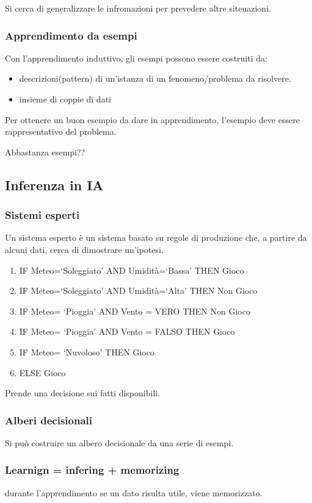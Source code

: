 Si cerca di generalizzare le infromazioni per prevedere altre siteuazioni.

\subsubsection{Apprendimento da esempi}
Con l'apprendimento induttivo, gli esempi possono essere costruiti da:
\begin{itemize}
    \item descrizioni(pattern) di un'istanza di un fenomeno/problema da risolvere.
    \item insieme di coppie di dati
\end{itemize}

Per ottenere un buon esempio da dare in apprendimento, l'esempio deve essere rappresentativo del problema.

Abbastanza esempi??

\subsection{Inferenza in IA}
\subsubsection{Sistemi esperti}
Un sistema esperto è un sistema basato su regole di produzione che, a partire da alcuni dati, cerca
di dimostrare un'ipotesi.

\begin{enumerate}
    \item IF Meteo=‘Soleggiato’ AND Umidità=‘Bassa’ THEN Gioco
    \item IF Meteo=‘Soleggiato’ AND Umidità=‘Alta’ THEN Non Gioco
    \item IF Meteo= ‘Pioggia’ AND Vento = VERO THEN Non Gioco
    \item IF Meteo= ‘Pioggia’ AND Vento = FALSO THEN Gioco
    \item IF Meteo= ‘Nuvoloso’ THEN Gioco
    \item ELSE Gioco
\end{enumerate}

Prende una decisione sui fatti disponibili.

\subsubsection{Alberi decisionali}
Si può costruire un albero decisionale da una serie di esempi.

\subsubsection{Learnign = infering + memorizing}
durante l'apprendimento se un dato risulta utile, viene memorizzato.

